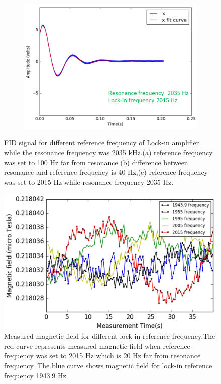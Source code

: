 \documentclass[12pt]{report}
\begin{document}
\begin{figure}
\begin{subfigure}[b]{0.4\textwidth}
        \includegraphics[width=\textwidth]{figures/reference_frequency2}
        \caption{}
        \label{fig:five over x}
    \end{subfigure}
    \caption{FID signal for different reference frequency of Lock-in amplifier while the resonance frequency was 2035 kHz.(a) reference frequency was set to 100 Hz far from resonance (b) difference between resonance and reference frequency is 40 Hz,(c) reference frequency was set to 2015 Hz while resonance frequency 2035 Hz. }
\end{figure}
\begin{figure}[h]
\centering\includegraphics[width=0.8\linewidth]{figures/reference_frequency}
\caption{Measured magnetic field for different lock-in reference frequency.The red curve represents measured magnetic field when reference frequency was set to 2015 Hz which is 20 Hz far from resonance frequency. The blue curve shows magnetic field for lock-in reference frequency 1943.9 Hz.}
\end{figure}
\end{document}
